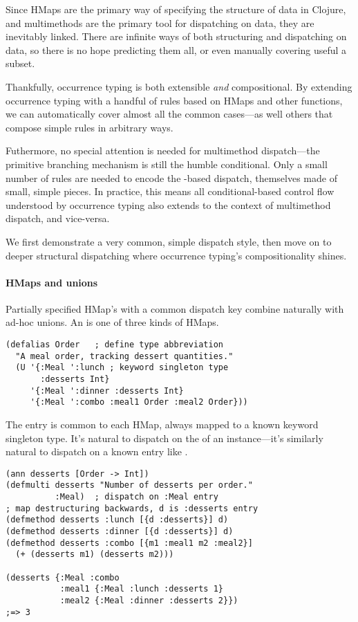 Since HMaps are the primary way of specifying the structure of data in Clojure,
and multimethods are the primary tool for dispatching on data, they are inevitably
linked.
There are infinite ways of both structuring and dispatching on data, so there is no
hope predicting them all, or even manually covering useful a subset.

Thankfully, occurrence typing is both extensible \emph{and} compositional.
By extending occurrence typing with
a handful of rules based on HMaps and other functions, 
we can automatically cover almost all the common cases---as well others
that compose simple rules in arbitrary ways.

Futhermore, no special attention is needed for multimethod dispatch---the primitive branching
mechanism is still the humble  conditional. Only a small number of rules are needed
to encode the -based dispatch, themselves made of small, simple pieces.
In practice, this means all conditional-based control flow understood by occurrence typing
also extends to the context of multimethod dispatch, and vice-versa.

We first demonstrate a very common, simple dispatch style,
then move on to deeper structural dispatching where occurrence typing's
compositionality shines.

\paragraph{HMaps and unions} Partially specified HMap's with a common dispatch key
combine naturally with ad-hoc unions.
An  is one of three kinds of HMaps.

\begin{verbatim}
(defalias Order   ; define type abbreviation
  "A meal order, tracking dessert quantities."
  (U '{:Meal ':lunch ; keyword singleton type
       :desserts Int}
     '{:Meal ':dinner :desserts Int}
     '{:Meal ':combo :meal1 Order :meal2 Order}))
\end{verbatim}

The  entry is common to each HMap, always mapped to a known keyword singleton
type.
It's natural to dispatch on the  of an instance---it's similarly
natural to dispatch on a known entry like .

\begin{verbatim}
(ann desserts [Order -> Int])
(defmulti desserts "Number of desserts per order."
          :Meal)  ; dispatch on :Meal entry
; map destructuring backwards, d is :desserts entry
(defmethod desserts :lunch [{d :desserts}] d)
(defmethod desserts :dinner [{d :desserts}] d)
(defmethod desserts :combo [{m1 :meal1 m2 :meal2}]
  (+ (desserts m1) (desserts m2)))

(desserts {:Meal :combo 
           :meal1 {:Meal :lunch :desserts 1}
           :meal2 {:Meal :dinner :desserts 2}})
;=> 3
\end{verbatim}

